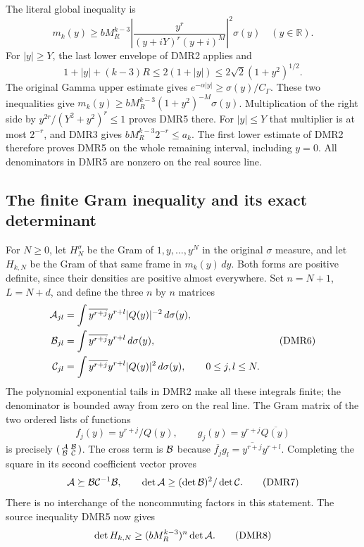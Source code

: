 \documentclass[11pt,a4paper]{article}
\begin{document}
The literal global inequality is
\[
 \boxed{\quad
 m_k(y)\geq bM_R^{k-3}
     \left|\frac{y^r}{(y+iY)^r(y+i)^M}\right|^2\sigma(y)
       \quad(y\in\mathbb R).\quad}
 \tag{DMR5}
\]
For $|y|\geq Y$, the last lower envelope of DMR2 applies and
\[
 1+|y|+(k-3)R\leq2(1+|y|)
                           \leq2\sqrt2(1+y^2)^{1/2}.
\]
The original Gamma upper estimate gives
$e^{-\alpha|y|}\geq \sigma(y)/C_\Gamma$.
These two inequalities give
$m_k(y)\geq bM_R^{k-3}(1+y^2)^{-M}\sigma(y)$.
Multiplication of the right side by
$y^{2r}/(Y^2+y^2)^r\leq1$ proves DMR5 there.
For $|y|\leq Y$ that multiplier is at most $2^{-r}$, and DMR3
gives $bM_R^{k-3}2^{-r}\leq a_k$. The first lower estimate of DMR2
therefore proves DMR5 on the whole remaining interval, including
$y=0$. All denominators in DMR5 are nonzero on the real source line.

\subsection{The finite Gram inequality and its exact determinant}

For $N\geq0$, let $H_N^\sigma$ be the Gram of $1,y,\ldots,y^N$
in the original $\sigma$ measure, and let $H_{k,N}$ be the Gram
of that same frame in $m_k(y)\,dy$. Both forms are positive
definite, since their densities are positive almost everywhere.
Set $n=N+1$, $L=N+d$, and define the three $n$ by $n$ matrices
\[
 \begin{split}
 {\cal A}_{jl}&=\int \overline{y^{r+j}}y^{r+l}|Q(y)|^{-2}\,d\sigma(y),\\
 {\cal B}_{jl}&=\int \overline{y^{r+j}}y^{r+l}\,d\sigma(y),\\
 {\cal C}_{jl}&=\int \overline{y^{r+j}}y^{r+l}|Q(y)|^2\,d\sigma(y),
                  \qquad 0\leq j,l\leq N.
 \end{split}\tag{DMR6}
\]
The polynomial exponential tails in DMR2 make all these integrals
finite; the denominator is bounded away from zero on the real line.
The Gram matrix of the two ordered lists of functions
\[
 f_j(y)=y^{r+j}/Q(y),\qquad
 g_j(y)=y^{r+j}\overline{Q(y)}
\]
is precisely
$\left(\begin{smallmatrix}{\cal A}&{\cal B}\\
{\cal B}&{\cal C}\end{smallmatrix}\right)$.
The cross term is $ {\cal B}$ because
$\overline{f_j}g_l=\overline{y^{r+j}}y^{r+l}$.
Completing the square in its second coefficient vector proves
\[
 {\cal A}\succeq{\cal B}{\cal C}^{-1}{\cal B},\qquad
 \det{\cal A}\geq(\det{\cal B})^2/\det{\cal C}.
 \tag{DMR7}
\]
There is no interchange of the noncommuting factors in this statement.
The source inequality DMR5 now gives
\[
 \det H_{k,N}\geq (bM_R^{k-3})^n\det{\cal A}.
 \tag{DMR8}
\]
\end{document}
